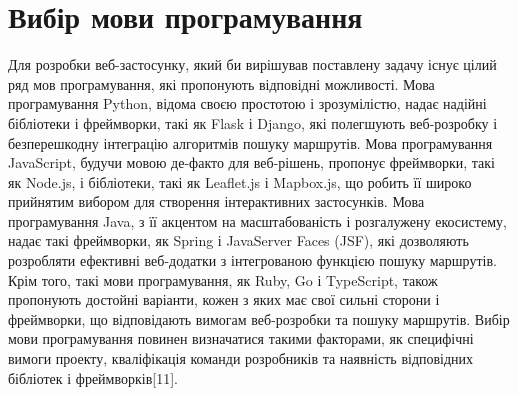 \section{Вибір мови програмування}
\label{sec:programming-language}

Для розробки веб-застосунку, який би вирішував поставлену задачу існує цілий ряд мов програмування, які пропонують відповідні можливості. Мова програмування Python, відома своєю простотою і зрозумілістю, надає надійні бібліотеки і фреймворки, такі як Flask і Django, які полегшують веб-розробку і безперешкодну інтеграцію алгоритмів пошуку маршрутів. Мова програмування JavaScript, будучи мовою де-факто для веб-рішень, пропонує фреймворки, такі як Node.js, і бібліотеки, такі як Leaflet.js і Mapbox.js, що робить її широко прийнятим вибором для створення інтерактивних застосунків. Мова програмування Java, з її акцентом на масштабованість і розгалужену екосистему, надає такі фреймворки, як Spring і JavaServer Faces (JSF), які дозволяють розробляти ефективні веб-додатки з інтегрованою функцією пошуку маршрутів. Крім того, такі мови програмування, як Ruby, Go і TypeScript, також пропонують достойні варіанти, кожен з яких має свої сильні сторони і фреймворки, що відповідають вимогам веб-розробки та пошуку маршрутів. Вибір мови програмування повинен визначатися такими факторами, як специфічні вимоги проекту, кваліфікація команди розробників та наявність відповідних бібліотек і фреймворків[11].










